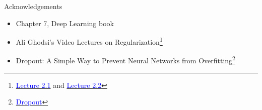 \begin{frame}
	\begin{block}{Acknowledgements}
		\begin{itemize}\justifying
			\item Chapter 7, Deep Learning book  
			\item Ali Ghodsi's Video Lectures on Regularization\footnote{\href{http://www.youtube.com/watch?v=21jL0I6wbns}{\textcolor{blue}{Lecture 2.1}} and \href{http://www.youtube.com/watch?v=_ojGVetxCpQ}{\textcolor{blue}{Lecture 2.2}}}
			\item Dropout:  A Simple Way to Prevent Neural Networks from Overfitting\footnote{\href{http://www.cs.toronto.edu/~hinton/absps/JMLRdropout.pdf}{\textcolor{blue}{Dropout}}}
		\end{itemize}
	\end{block}
\end{frame}
